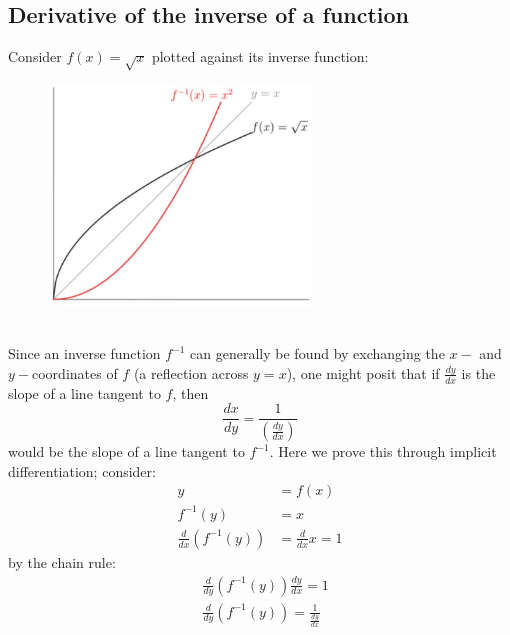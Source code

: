 \documentclass{report}
\begin{document}
\subsection{Derivative of the inverse of a function} %
Consider $f(x)=\sqrt{x}$ plotted against its inverse function:
\begin{figure}[h]
\includegraphics[width=7cm]{Capture14}
\centering
{}
\end{figure}\\
Since an inverse function $f^{-1}$ can generally be found by exchanging the $x-$ and 
$y-$coordinates of $f$ (a reflection across $y=x$), one might posit that if $\frac{dy}{dx}$ is
the slope of a line tangent to $f$, then
\begin{equation*}
\frac{dx}{dy}=\frac{1}{(\frac{dy}{dx})}
\end{equation*}
would be the slope of a line tangent to $f^{-1}$. Here we prove this through
implicit differentiation; consider:
\begin{align*}
y&=f(x)\\
f^{-1}(y)&=x\\
\frac{d}{dx}(f^{-1}(y))&=\frac{d}{dx}x=1
\end{align*}
by the chain rule:
\begin{align*}
&\frac{d}{dy}(f^{-1}(y))\frac{dy}{dx}=1\\
&\frac{d}{dy}(f^{-1}(y))=\frac{1}{\frac{dy}{dx}}
\end{align*}
\newpage
\end{document}
